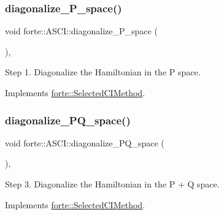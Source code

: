 \subsubsection{\texorpdfstring{diagonalize\+\_\+\+P\+\_\+space()}{diagonalize\_P\_space()}}
{\footnotesize\ttfamily void forte\+::\+A\+S\+C\+I\+::diagonalize\+\_\+\+P\+\_\+space (\begin{DoxyParamCaption}{ }\end{DoxyParamCaption})\hspace{0.3cm}{\ttfamily [override]}, {\ttfamily [virtual]}}



Step 1. Diagonalize the Hamiltonian in the P space. 



Implements \mbox{\hyperlink{classforte_1_1_selected_c_i_method_a7b2b41da889659f03361f625c6df44d2}{forte\+::\+Selected\+C\+I\+Method}}.

\mbox{\label{classforte_1_1_a_s_c_i_aa285dc9063075f23a7a1f4a1513c8aac}} 
\subsubsection{\texorpdfstring{diagonalize\+\_\+\+P\+Q\+\_\+space()}{diagonalize\_PQ\_space()}}
{\footnotesize\ttfamily void forte\+::\+A\+S\+C\+I\+::diagonalize\+\_\+\+P\+Q\+\_\+space (\begin{DoxyParamCaption}{ }\end{DoxyParamCaption})\hspace{0.3cm}{\ttfamily [override]}, {\ttfamily [virtual]}}



Step 3. Diagonalize the Hamiltonian in the P + Q space. 



Implements \mbox{\hyperlink{classforte_1_1_selected_c_i_method_a9f01588d22401cd2631a09940ea7db50}{forte\+::\+Selected\+C\+I\+Method}}.

\mbox{\label{classforte_1_1_a_s_c_i_a197192d707eee6c0c6046d3dfdf78162}} 
